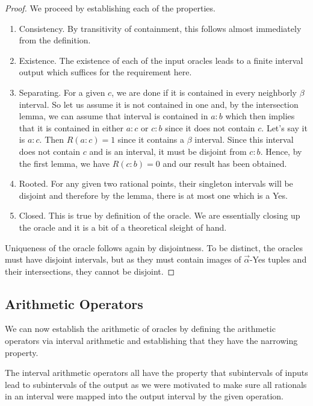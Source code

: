 \documentclass[12pt]{article}
\theoremstyle{remark}
\begin{document}
\begin{proof}
We proceed by establishing each of the properties. 

\begin{enumerate}
    \item Consistency. By transitivity of containment, this follows almost immediately from the definition. 
    \item Existence. The existence of each of the input oracles leads to a finite interval output which suffices for the requirement here. 
    \item Separating. For a given $c$, we are done if it is contained in every neighborly $\beta$ interval. So let us assume it is not contained in one and, by the intersection lemma, we can assume that interval is contained in $a:b$ which then implies that it is contained in either $a:c$ or $c:b$ since it does not contain $c$. Let's say it is $a:c$. Then $R(a:c)=1$ since it contains a $\beta$ interval. Since this interval does not contain $c$ and is an interval, it must be disjoint from $c:b$. Hence, by the first lemma, we have $R(c:b)=0$ and our result has been obtained.
    \item Rooted. For any given two rational points, their singleton intervals will be disjoint and therefore by the lemma, there is at most one which is a Yes. 
    \item Closed. This is true by definition of the oracle. We are essentially closing up the oracle and it is a bit of a theoretical sleight of hand.
\end{enumerate}

Uniqueness of the oracle follows again by disjointness. To be distinct, the oracles must have disjoint intervals, but  as they must contain images of $\vec{\alpha}$-Yes tuples and their intersections, they cannot be disjoint. 

\end{proof}



\subsection{Arithmetic Operators}

We can now establish the arithmetic of oracles by defining the arithmetic operators via interval arithmetic and establishing that they have the narrowing property.

The interval arithmetic operators all have the property that subintervals of inputs lead to subintervals of the output as we were motivated to make sure all rationals in an interval were mapped into the output interval by the given operation. 
\end{document}
